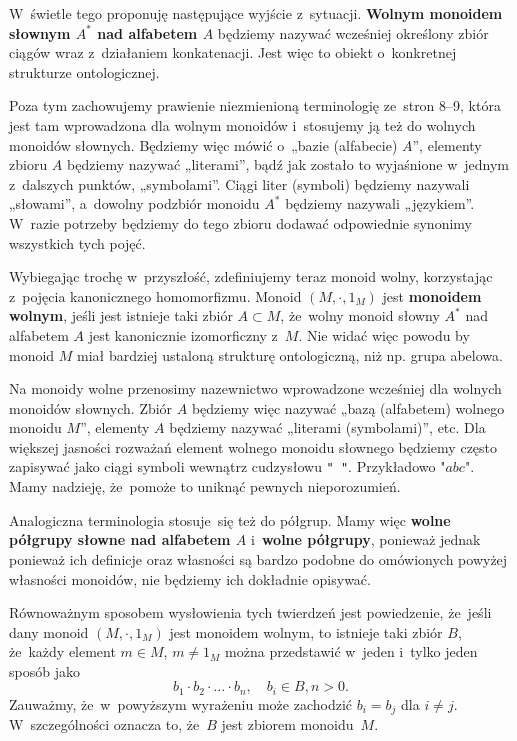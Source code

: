 \documentclass[a4paper,11pt]{article}
\begin{document}
W~świetle tego proponuję następujące wyjście z~sytuacji.
\textbf{Wolnym monoidem słownym $A^{ * }$ nad alfabetem $A$}
będziemy nazywać wcześniej określony zbiór ciągów wraz z~działaniem
konkatenacji. Jest więc to obiekt o~konkretnej strukturze
ontologicznej.

Poza tym zachowujemy prawienie niezmienioną terminologię ze~stron 8--9,
która jest tam wprowadzona dla wolnym monoidów i~stosujemy ją też do
wolnych monoidów słownych. Będziemy więc mówić o~„bazie (alfabecie) $A$”,
elementy zbioru $A$ będziemy nazywać „literami”, bądź jak zostało to
wyjaśnione w~jednym z~dalszych punktów, „symbolami”. Ciągi liter (symboli)
będziemy nazywali „słowami”, a~dowolny podzbiór monoidu $A^{ * }$ będziemy
nazywali „językiem”. W~razie potrzeby będziemy do tego zbioru dodawać
odpowiednie synonimy wszystkich tych pojęć.

Wybiegając trochę w~przyszłość, zdefiniujemy teraz monoid wolny, korzystając
z~pojęcia kanonicznego homomorfizmu. Monoid $( M, \cdot, 1_{ M } )$ jest
\textbf{monoidem wolnym}, jeśli jest istnieje taki zbiór $A \subset M$, że~wolny
monoid słowny $A^{ * }$ nad alfabetem $A$ jest kanonicznie izomorficzny
z~$M$. Nie widać więc powodu by monoid $M$ miał bardziej ustaloną strukturę
ontologiczną, niż np. grupa abelowa.

Na monoidy wolne przenosimy nazewnictwo wprowadzone wcześniej dla wolnych
monoidów słownych. Zbiór $A$ będziemy więc nazywać „bazą (alfabetem)
wolnego monoidu $M$”, elementy $A$ będziemy nazywać „literami (symbolami)”,
etc. Dla większej jasności rozważań element wolnego monoidu słownego
będziemy często zapisywać jako ciągi symboli wewnątrz cudzysłowu
\texttt{" "}. Przykładowo $\texttt{"} abc \texttt{"}$. Mamy nadzieję,
że~pomoże to uniknąć pewnych nieporozumień.

Analogiczna terminologia stosuje~się też do półgrup. Mamy więc \textbf{wolne
  półgrupy słowne nad alfabetem $A$} i~\textbf{wolne półgrupy}, ponieważ
jednak ponieważ ich definicje oraz własności są bardzo podobne do
omówionych powyżej własności monoidów, nie będziemy ich dokładnie opisywać.

Równoważnym sposobem wysłowienia tych twierdzeń jest powiedzenie, że~jeśli
dany monoid $( M, \cdot, 1_{ M } )$ jest monoidem wolnym, to istnieje taki zbiór
$B$, że~każdy element $m \in M$, $m \neq 1_{ M }$ można przedstawić
w~jeden i~tylko jeden sposób jako
\begin{equation}
  \label{eq:Forys-Forys-06}
  b_{ 1 } \cdot b_{ 2 } \cdot \ldots \cdot b_{ n }, \quad
  b_{ i } \in B, n > 0.
\end{equation}
Zauważmy, że~w~powyższym wyrażeniu może zachodzić $b_{ i } = b_{ j }$
dla $i \neq j$. W~szczególności oznacza to, że~$B$ jest zbiorem monoidu~$M$.
\end{document}
